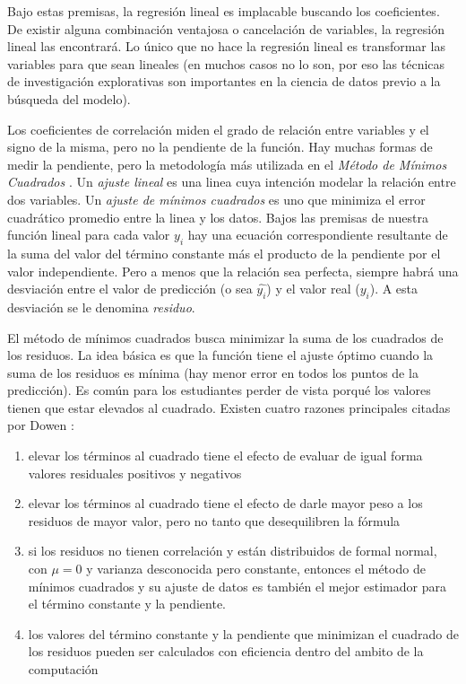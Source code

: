 \documentclass[letterpaper, spanish, 11pt]{report}
\begin{document}
Bajo estas premisas, la regresión lineal es implacable buscando los coeficientes. De existir alguna combinación ventajosa o cancelación de variables, la regresión lineal las encontrará. Lo único que no hace la regresión lineal es transformar las variables para que sean lineales (en muchos casos no lo son, por eso las técnicas de investigación explorativas son importantes en la ciencia de datos previo a la búsqueda del modelo).

Los coeficientes de correlación miden el grado de relación entre variables y el signo de la misma, pero no la pendiente de la función. Hay muchas formas de medir la pendiente, pero la metodología más utilizada en el \emph{Método de Mínimos Cuadrados} \cite{thinkStats}. Un \emph{ajuste lineal} es una linea cuya intención modelar la relación entre dos variables. Un \emph{ajuste de mínimos cuadrados} es uno que minimiza el error cuadrático promedio entre la linea y los datos. Bajos las premisas de nuestra función lineal para cada valor $y_{i}$ hay una ecuación correspondiente resultante de la suma del valor del término constante más el producto de la pendiente por el valor independiente. Pero a menos que la relación sea perfecta, siempre habrá una desviación entre el valor de predicción (o sea $\hat{y_{i}}$) y el valor real ($y_{i}$). A esta desviación se le denomina \emph{residuo}.  

El método de mínimos cuadrados busca minimizar la suma de los cuadrados de los residuos. La idea básica es que la función tiene el ajuste óptimo cuando la suma de los residuos es mínima (hay menor error en todos los puntos de la predicción). Es común para los estudiantes perder de vista porqué los valores tienen que estar elevados al cuadrado. Existen cuatro razones principales citadas por Dowen \cite{thinkStats}:

\begin{enumerate}
	\item elevar los términos al cuadrado tiene el efecto de evaluar de igual forma valores residuales positivos y negativos
	\item elevar los términos al cuadrado tiene el efecto de darle mayor peso a los residuos de mayor valor, pero no tanto que desequilibren la fórmula
	\item si los residuos no tienen correlación y están distribuidos de formal normal, con $\mu = 0$ y varianza desconocida pero constante, entonces el método de mínimos cuadrados y su ajuste de datos es también el mejor estimador para el término constante y la pendiente. 
	\item los valores del término constante y la pendiente que minimizan el cuadrado de los residuos pueden ser calculados con eficiencia dentro del ambito de la computación 
\end{enumerate}
 
\end{document}
